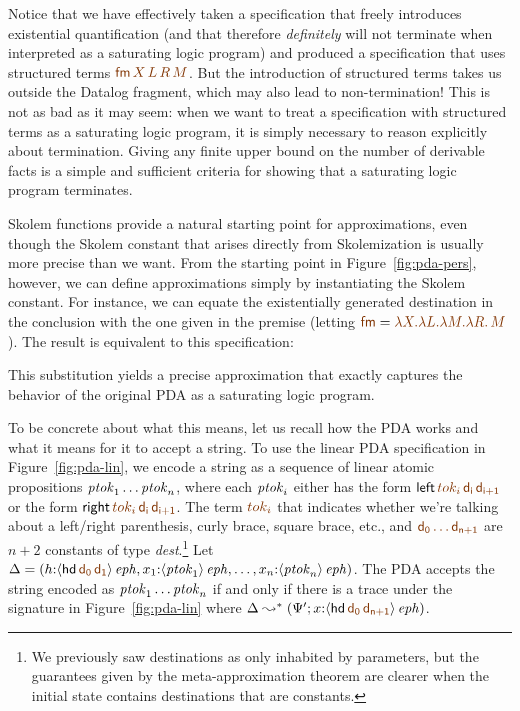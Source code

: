 Notice that we have effectively taken a specification that freely
introduces existential quantification (and that therefore {\it
  definitely} will not terminate when interpreted as a saturating
logic program) and produced a specification that uses structured terms
$\lf{{\sf fm}\,X\,L\,R\,M}$. But the
introduction of structured terms takes us outside the Datalog fragment,
which may also lead to non-termination! This is not as bad as it may
seem: when we want to treat a specification with structured terms as a
saturating logic program, it is simply necessary to reason explicitly
about termination. Giving any finite upper bound on the number of
derivable facts is a simple and sufficient criteria for showing that a
saturating logic program terminates.

Skolem functions provide a natural starting point for approximations,
even though the Skolem constant that arises directly from
Skolemization is usually more precise than we want. From the starting
point in Figure~\ref{fig:pda-pers}, however, we can define
approximations simply by instantiating the Skolem constant.  For
instance, we can equate the existentially generated destination in the
conclusion with the one given in the premise (letting $\lf{\sf fm} =
\lf{\lambda X. \lambda L. \lambda M. \lambda R.\, M}$). The result is
equivalent to this specification:

\smallskip
{}
\smallskip

\noindent This substitution yields a precise approximation that
exactly captures the behavior of the original PDA as a saturating
logic program. 

To be concrete about what this means, let us recall how the PDA works
and what it means for it to accept a string.  To use the linear PDA
specification in Figure~\ref{fig:pda-lin}, we encode a string as a
sequence of linear atomic propositions ${\it ptok}_1\ldots {\it
  ptok}_n$, where each ${\it ptok}_i$ either has the form ${\sf
  left}\,\lf{tok_i}\,\lf{\sf d_i}\,\lf{\sf d_{i+1}}$ or the form ${\sf
  right}\,\lf{tok_i}\,\lf{\sf d_i}\,\lf{\sf d_{i+1}}$. The term $\lf{tok_i}$
that indicates whether we're talking about a left/right parenthesis,
curly brace, square brace, etc., and $\lf{{\sf d_0}\ldots{\sf
    d_{n+1}}}$ are $n+2$ constants of type {\it dest}.\footnote{We
  previously saw destinations as only inhabited by parameters, but the
  guarantees given by the meta-approximation theorem are clearer when
  the initial state contains destinations that are constants.}  Let
$\Delta = (h{:}\iseph{\susp{{\sf hd}\,\lf{\sf d_0}\,\lf{\sf d_1}}},
x_1{:}{\iseph{\susp{{\it ptok}_1}}}, \ldots,
x_n{:}{\iseph{\susp{{\it ptok}_n}}})$. The PDA
accepts the string encoded as ${\it ptok}_1\ldots {\it ptok}_n$ if and
only if there is a trace under the signature in
Figure~\ref{fig:pda-lin} where $\Delta \leadsto^* (\Psi';
x{:}\iseph{\susp{{{\sf hd}\,\lf{\sf d_0}\,\lf{\sf d_{n+1}}}}})$.

